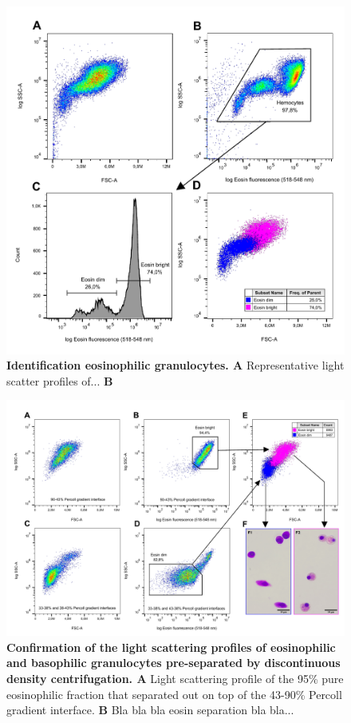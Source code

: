 \begin{figure}[!ht]
    \centering
    \includegraphics[width=1.0\textwidth]{figures/Eosin and Percoll exp/Pool II 0.75 per m.pdf}
    \caption{\textbf{Identification eosinophilic granulocytes. A} Representative light scatter profiles of... \textbf{B} }
    \label{fig:eosin_exp2}
\end{figure}

\begin{figure}[!ht]
    \centering
    \includegraphics[width=1.0\textwidth]{figures/Eosin and Percoll exp/Percoll sep for Inkscape 2.pdf}
    \caption{\textbf{Confirmation of the light scattering profiles of eosinophilic and basophilic granulocytes pre-separated by discontinuous density centrifugation. A} Light scattering profile of the 95\% pure eosinophilic fraction that separated out on top of the 43-90\% Percoll gradient interface. \textbf{B} Bla bla bla eosin separation bla bla...}
    \label{fig:Percoll-dotplots}
\end{figure}







